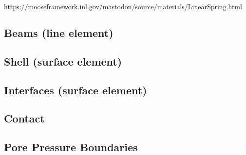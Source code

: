 https://mooseframework.inl.gov/mastodon/source/materials/LinearSpring.html

\subsection{Beams (line element)}
\label{chap:entities-beams}


\subsection{Shell (surface element)}
\label{chap:entities-shell}

\subsection{Interfaces (surface element)}

\subsection{Contact}

\subsection{Pore Pressure Boundaries}
